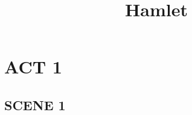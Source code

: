 \documentclass{blog}
\title{Hamlet}
\begin{document}
\maketitle
\tableofcontents
\section{ACT 1}
\subsection{SCENE 1}
\cite{SHAKESPEARE_2008_HAMLET}

\printbibliography
\end{document}
